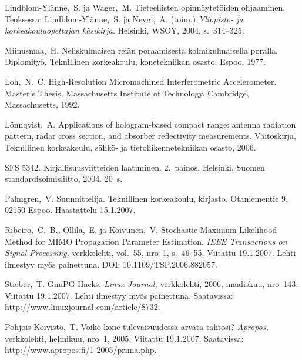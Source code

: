 \documentclass[english,12pt,a4paper,pdftex,sci,utf8]{aaltothesis}
\begin{document}
\begin{thebibliography}{99}
 Lindblom-Yl\"anne,\ S. ja Wager,\ M.  Tieteellisten
  opinn\"aytet\"oiden ohjaaminen. Teoksessa: Lindblom-Yl\"anne,\ S. ja
  Nevgi,\ A. (toim.) \textit{Yliopisto- ja korkeakouluopettajan
    k\"asikirja.}  Helsinki, WSOY, 2004, s.\ 314--325.

 Miinusmaa,\ H. Neliskulmaisen rei\"an poraamisesta
  kolmikulmaisella poralla. Diplomity\"o, Teknillinen korkeakoulu,
  konetekniikan osasto, Espoo, 1977.

 Loh,\ N.\ C. High-Resolution Micromachined
  Interferometric Accelerometer. Master's Thesis, Massachusetts
  Institute of Technology, Cambridge,
  Massachusetts, 1992.

 L\"onnqvist,\ A.
  Applications of hologram-based compact
    range: antenna radiation pattern, radar cross section, and
    absorber reflectivity measurements.
  V\"ait\"oskirja, Teknillinen korkeakoulu, s\"ahk\"o- ja tietoliikennetekniikan
  osasto, 2006.

 SFS 5342. Kirjallisuusviitteiden laatiminen. 2.\ painos.
  Helsinki, Suomen standardisoimisliitto, 2004. 20~s.

 Palmgren,\ V. Suunnittelija. Teknillinen
  korkeakoulu, kirjasto. Otaniementie 9, 02150 Espoo. Haastattelu
  15.1.2007.

 Ribeiro,\ C.\ B., Ollila,\ E. ja Koivunen,\ V.
  Stochastic Maximum-Likelihood Method for
    MIMO Propagation Parameter Estimation.
 \textit{IEEE Transactions
    on Signal Processing,} verkkolehti, vol.\ 55, nro~1, s.\ 46--55.
  Viitattu 19.1.2007. Lehti ilmestyy my\"os painettuna. DOI:
  10.1109/TSP.2006.882057.

 Stieber,\ T. GnuPG Hacks. \textit{Linux Journal,}
  verkkolehti, 2006, maaliskuu, nro~143. Viitattu 19.1.2007. Lehti
  ilmestyy my\"os painettuna. Saatavissa:
  \url{http://www.linuxjournal.com/article/8732.}

 Pohjois-Koivisto,\ T. Voiko kone tulevaisuudessa arvata
  tahtosi?  \textit{Apropos,} verkkolehti, helmikuu, nro~1, 2005.
  Viitattu 19.1.2007.  Saatavissa:
  \url{http://www.apropos.fi/1-2005/prima.php.}


\end{thebibliography}
\end{document}
